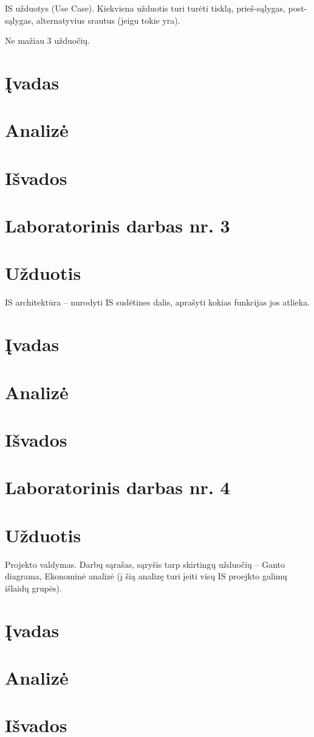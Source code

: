 \documentclass[10pt]{IEEEtran}
\begin{document}
            IS užduotys (Use Case). Kiekviena užduotis turi turėti tisklą, prieš-sąlygas, post-sąlygas, alternatyvius srautus (jeigu tokie yra).

            Ne mažiau 3 užduočių.

        \section{Įvadas}

        \section{Analizė}

        \section{Išvados}

    \section{Laboratorinis darbas nr. 3}

        \section{Užduotis}

            IS architektūra -- nurodyti  IS sudėtines dalis, aprašyti kokias funkcijas jos atlieka.

        \section{Įvadas}

        \section{Analizė}

        \section{Išvados}

    \section{Laboratorinis darbas nr. 4}

        \section{Užduotis}

            Projekto valdymas. Darbų sąrašas, sąryšis tarp skirtingų užduočių -- Ganto diagrama, Ekonominė analizė (į šią analizę turi įeiti visų IS proejkto galimų išlaidų grupės).

        \section{Įvadas}

        \section{Analizė}

        \section{Išvados}
\end{document}
